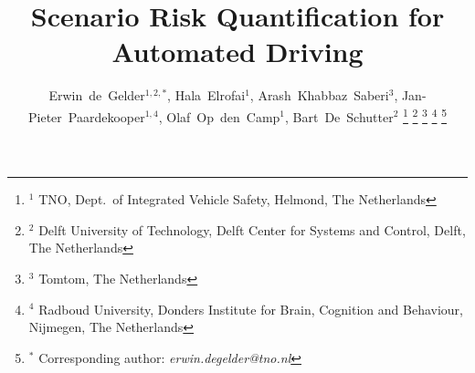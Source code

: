 \documentclass[journal]{IEEEtran}
\begin{document}
\date{}

\title{Scenario Risk Quantification for Automated Driving}

\author{Erwin~de~Gelder$^{1,2,*}$,
	    Hala~Elrofai$^{1}$,
	    Arash~Khabbaz~Saberi$^{3}$,
	    Jan-Pieter~Paardekooper$^{1,4}$,
	    Olaf~Op~den~Camp$^{1}$,
	    Bart~De~Schutter$^{2}$%
\thanks{$^1$ TNO, Dept.\ of Integrated Vehicle Safety, Helmond, The Netherlands}%
\thanks{$^2$ Delft University of Technology, Delft Center for Systems and Control, Delft, The Netherlands}%
\thanks{$^3$ Tomtom, The Netherlands}%
\thanks{$^4$ Radboud University, Donders Institute for Brain, Cognition and Behaviour, Nijmegen, The Netherlands}%
\thanks{$^*$ Corresponding author: \textit{erwin.degelder@tno.nl}}}%

\maketitle

\acresetall










\printbibliography
\end{document}
